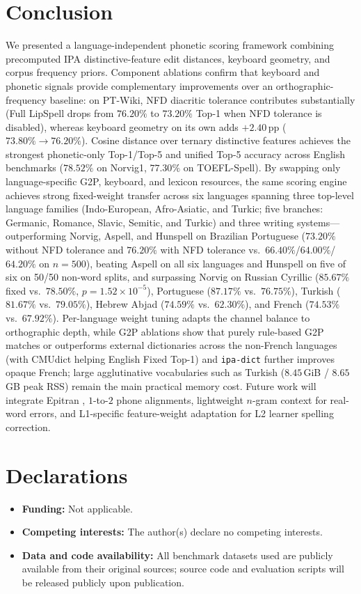 \documentclass[11pt,a4paper]{article}
\begin{document}
\section{Conclusion}
\label{sec:conclusion}
We presented a language-independent phonetic scoring framework combining precomputed IPA distinctive-feature edit distances, keyboard geometry, and corpus frequency priors. Component ablations confirm that keyboard and phonetic signals provide complementary improvements over an orthographic-frequency baseline: on PT-Wiki, NFD diacritic tolerance contributes substantially (Full LipSpell drops from $76.20\%$ to $73.20\%$ Top-1 when NFD tolerance is disabled), whereas keyboard geometry on its own adds $+2.40$\,pp ($73.80\% \rightarrow 76.20\%$). Cosine distance over ternary distinctive features achieves the strongest phonetic-only Top-1/Top-5 and unified Top-5 accuracy across English benchmarks ($78.52\%$ on Norvig1, $77.30\%$ on TOEFL-Spell). By swapping only language-specific G2P, keyboard, and lexicon resources, the same scoring engine achieves strong fixed-weight transfer across six languages spanning three top-level language families (Indo-European, Afro-Asiatic, and Turkic; five branches: Germanic, Romance, Slavic, Semitic, and Turkic) and three writing systems---outperforming Norvig, Aspell, and Hunspell on Brazilian Portuguese ($73.20\%$ without NFD tolerance and $76.20\%$ with NFD tolerance vs.\ $66.40\%$/$64.00\%$/$64.20\%$ on $n=500$), beating Aspell on all six languages and Hunspell on five of six on 50/50 non-word splits, and surpassing Norvig on Russian Cyrillic ($85.67\%$ fixed vs.\ $78.50\%$, $p=1.52\times 10^{-5}$), Portuguese ($87.17\%$ vs.\ $76.75\%$), Turkish ($81.67\%$ vs.\ $79.05\%$), Hebrew Abjad ($74.59\%$ vs.\ $62.30\%$), and French ($74.53\%$ vs.\ $67.92\%$). Per-language weight tuning adapts the channel balance to orthographic depth, while G2P ablations show that purely rule-based G2P matches or outperforms external dictionaries across the non-French languages (with CMUdict helping English Fixed Top-1) and \texttt{ipa-dict} further improves opaque French; large agglutinative vocabularies such as Turkish ($8.45$\,GiB / $8.65$\,GB peak RSS) remain the main practical memory cost. Future work will integrate Epitran \citep{mortensen2018epitran}, $1$-to-$2$ phone alignments, lightweight $n$-gram context for real-word errors, and L1-specific feature-weight adaptation for L2 learner spelling correction.

\section*{Declarations}
\begin{itemize}
    \item \textbf{Funding:} Not applicable.
    \item \textbf{Competing interests:} The author(s) declare no competing interests.
    \item \textbf{Data and code availability:} All benchmark datasets used are publicly available from their original sources; source code and evaluation scripts will be released publicly upon publication.
\end{itemize}
\end{document}
